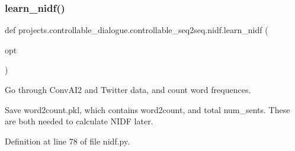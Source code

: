 \mbox{\label{namespaceprojects_1_1controllable__dialogue_1_1controllable__seq2seq_1_1nidf_afcd3d0cbb49648e760e9875d32f53f19}} 
\subsubsection{\texorpdfstring{learn\+\_\+nidf()}{learn\_nidf()}}
{\footnotesize\ttfamily def projects.\+controllable\+\_\+dialogue.\+controllable\+\_\+seq2seq.\+nidf.\+learn\+\_\+nidf (\begin{DoxyParamCaption}\item[{}]{opt }\end{DoxyParamCaption})}

\begin{DoxyVerb}Go through ConvAI2 and Twitter data, and count word frequences.

Save word2count.pkl, which contains word2count, and total num_sents. These are both
needed to calculate NIDF later.
\end{DoxyVerb}
 

Definition at line 78 of file nidf.\+py.


